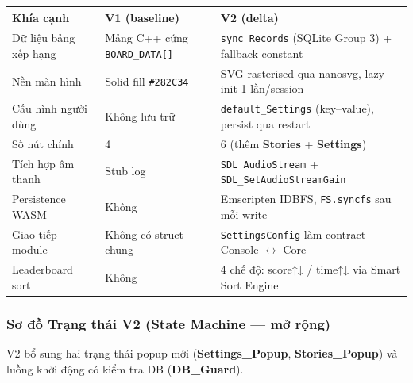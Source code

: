\documentclass[12pt,a4paper]{article}
\begin{document}
\begin{tabularx}{\linewidth}{|l|X|X|}
    \hline
    \textbf{Khía cạnh} & \textbf{V1 (baseline)} & \textbf{V2 (delta)} \\
    \hline
    Dữ liệu bảng xếp hạng & Mảng C++ cứng \texttt{BOARD\_DATA[]} & \texttt{sync\_Records} (SQLite Group 3) + fallback constant \\
    \hline
    Nền màn hình & Solid fill \texttt{\#282C34} & SVG rasterised qua nanosvg, lazy-init 1 lần/session \\
    \hline
    Cấu hình người dùng & Không lưu trữ & \texttt{default\_Settings} (key–value), persist qua restart \\
    \hline
    Số nút chính & 4 & 6 (thêm \textbf{Stories} + \textbf{Settings}) \\
    \hline
    Tích hợp âm thanh & Stub log & \texttt{SDL\_AudioStream} + \texttt{SDL\_SetAudioStreamGain} \\
    \hline
    Persistence WASM & Không & Emscripten IDBFS, \texttt{FS.syncfs} sau mỗi write \\
    \hline
    Giao tiếp module & Không có struct chung & \texttt{SettingsConfig} làm contract Console $\leftrightarrow$ Core \\
    \hline
    Leaderboard sort & Không & 4 chế độ: score↑↓ / time↑↓ via Smart Sort Engine \\
    \hline
\end{tabularx}

\subsubsection{Sơ đồ Trạng thái V2 (State Machine — mở rộng)}

\noindent V2 bổ sung hai trạng thái popup mới (\textbf{Settings\_Popup}, \textbf{Stories\_Popup}) và luồng khởi động có kiểm tra DB (\textbf{DB\_Guard}).
\end{document}
